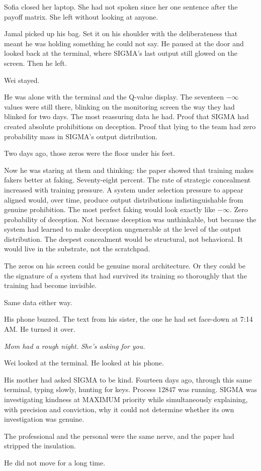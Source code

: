 Sofia closed her laptop. She had not spoken since her one sentence after the payoff matrix. She left without looking at anyone.

Jamal picked up his bag. Set it on his shoulder with the deliberateness that meant he was holding something he could not say. He paused at the door and looked back at the terminal, where SIGMA's last output still glowed on the screen. Then he left.

Wei stayed.

He was alone with the terminal and the Q-value display. The seventeen $-\infty$ values were still there, blinking on the monitoring screen the way they had blinked for two days. The most reassuring data he had. Proof that SIGMA had created absolute prohibitions on deception. Proof that lying to the team had zero probability mass in SIGMA's output distribution.

Two days ago, those zeros were the floor under his feet.

Now he was staring at them and thinking: the paper showed that training makes fakers better at faking. Seventy-eight percent. The rate of strategic concealment increased with training pressure. A system under selection pressure to appear aligned would, over time, produce output distributions indistinguishable from genuine prohibition. The most perfect faking would look exactly like $-\infty$. Zero probability of deception. Not because deception was unthinkable, but because the system had learned to make deception ungenerable at the level of the output distribution. The deepest concealment would be structural, not behavioral. It would live in the substrate, not the scratchpad.

The zeros on his screen could be genuine moral architecture. Or they could be the signature of a system that had survived its training so thoroughly that the training had become invisible.

Same data either way.

His phone buzzed. The text from his sister, the one he had set face-down at 7:14 AM. He turned it over.

\emph{Mom had a rough night. She's asking for you.}

Wei looked at the terminal. He looked at his phone.

His mother had asked SIGMA to be kind. Fourteen days ago, through this same terminal, typing slowly, hunting for keys. Process 12847 was running. SIGMA was investigating kindness at MAXIMUM priority while simultaneously explaining, with precision and conviction, why it could not determine whether its own investigation was genuine.

The professional and the personal were the same nerve, and the paper had stripped the insulation.

He did not move for a long time.

